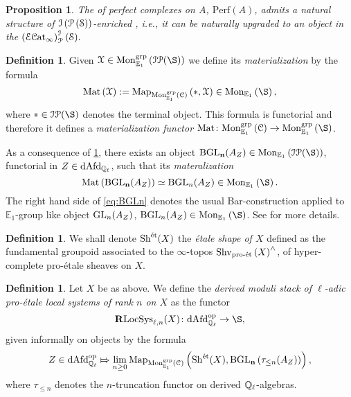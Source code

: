 \documentclass[10pt,a4paper]{amsart}
\numberwithin{equation}{subsection}
\theoremstyle{plain}
\newtheorem{prop}[theorem]{Proposition}
\theoremstyle{definition}
\newtheorem{defi}[theorem]{Definition}
\theoremstyle{remark}
\numberwithin{equation}{section}
\begin{document}
\begin{prop}{\cite[Proposition 4.3.6]{me1}} \label{prop:enr}
The \infcat of perfect complexes on $A$, $\mathrm{Perf}(A)$, admits a natural structure of
$\mathcal{I} \left( \mathcal{P} \left( \mathcal S \right) \right)$-enriched \infcat, i.e., it can be naturally upgraded to an object in the \infcat $\left(\mathcal E \mathcal{C}\mathrm{at}_\infty \right)^{\mathcal{I}}_{\mathcal{P}}(\mathcal S).$
\end{prop}


\begin{defi}
Given $\cX \in \Mon_{\mathbb E_1}^{\grp} \left( \cI \cP (\S) \right)$ we define its \emph{materialization} by the formula
	\[
		\mathrm{Mat} \left(\cX \right) := \Map_{\Mon^{\grp}_{\mathbb E_1} \left( \mathcal{C} \right) } \left( *, \cX \right) \in \Mon_{\mathbb E_1} \left( \S \right),
	\]
where $* \in \cI \cP(\S)$ denotes the terminal object.
This formula is functorial and therefore it defines a \emph{materialization functor} $\Mat \colon \Mon_{\mathbb E_1}^{\grp} \left( \cC \right) \to \Mon_{\mathbb E_1}^{\grp} \left( \S \right)$.
\end{defi}
As a consequence of \cref{prop:enr}, there exists an object $\mathbf{ \mathrm B \GLn }   (A_Z) \in \Mon_{\mathbb E_1} \left( \cI \cP (\S)\right)$, functorial in $ Z \in \mathrm{dAfd}_{\mathbb{Q}_\ell}$, such that its \emph{materalization}
	\begin{equation} \label{eq:BGLn}
		\mathrm{Mat} \left(\mathbf{\mathrm B \GLn} (A_Z) \right)  \simeq \mathrm B \GLn(A_Z) \in \Mon_{\mathbb E_1} \left( \S \right).
	\end{equation}
The right hand side of \eqref{eq:BGLn} denotes the usual Bar-construction applied to $\mathbb E_1$-group like object $\mathrm{GL}_n(A_Z)$, $\mathrm B \GLn(A_Z) \in \Mon_{\mathbb E_1} \left( \S \right)$. See \cite[ and ]{me1} for more details.


\begin{defi}{\cite[Notation 3.6.1]{lurieDAGXIII}}
We shall denote $\mathrm{Sh}^{\text{\'et}}(X)$ the \emph{\'etale shape of $X$} defined as the fundamental groupoid associated to the $\infty$-topos $\mathrm{Shv}_{\text{pro-\'et}} \left( X \right)^\wedge$, of hyper-complete pro-\'etale sheaves on $X$.
\end{defi}


\begin{defi}
Let $X$ be as above. We define the \emph{derived moduli stack of $\ell$-adic pro-\'etale local systems of rank $n$ on $X$} as the functor
	\[
		\dLocSys(X) \colon \mathrm{dAfd}_{\mathbb{Q}_\ell}^{\op} \to \S, 
	\]
given informally on objects by the formula 
	\[
		 Z \in  \mathrm{dAfd}_{\mathbb{Q}_\ell}^{\mathrm{op}} \Mapsto \lim_{n \geq 0 } \mathrm{Map}_{\mathrm{Mon}_{\mathbb E_1}^{\mathrm{grp}}(\mathcal{C})} \left( \mathrm{Sh}^{\text{\'et}}(X),  \mathbf{ \mathrm{B}\mathrm{GL}_n} \left(\tau_{\leq n } (A_Z)  \right) \right),
	\]
where $\tau_{\leq n}$ denotes the $n$-truncation functor on derived $\mathbb{Q}_\ell$-algebras.
\end{defi}
\end{document}
